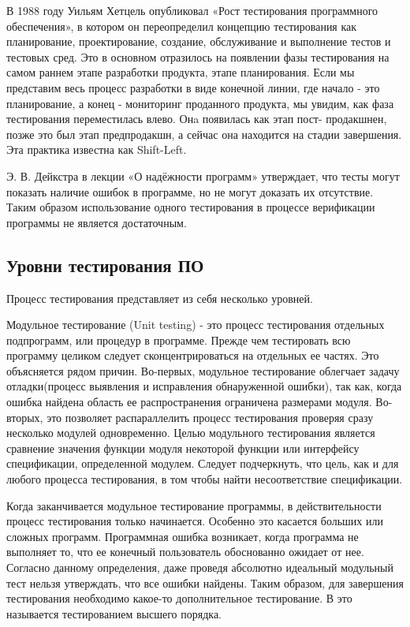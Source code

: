 В 1988 году Уильям Хетцель опубликовал «Рост тестирования программного обеспечения»\cite{Hetzel}, в котором 
он переопределил концепцию тестирования как планирование, проектирование, создание, обслуживание 
и выполнение тестов и тестовых сред. Это  в основном отразилось на появлении фазы тестирования 
на самом раннем этапе разработки продукта, этапе планирования. Если мы представим весь процесс 
разработки в виде конечной линии, где начало - это планирование, а конец - мониторинг проданного 
продукта, мы увидим, как фаза тестирования переместилась влево. Онa появилась как этап пост-
продакшнен, позже это был этап предпродакшн, а сейчас она находится на стадии завершения. Эта 
практика известна как Shift-Left.

Э. В. Дейкстра в лекции «О надёжности программ» утверждает, что тесты могут показать наличие 
ошибок в программе, но не могут доказать их отсутствие\cite{Dijkstra}. Таким образом 
использование одного тестирования в процессе верификации программы не является достаточным. 

\subsection{Уровни тестирования ПО}
Процесс тестирования представляет из себя несколько уровней. 

Модульное тестирование (Unit testing) - это процесс тестирования отдельных подпрограмм, или 
процедур в программе. Прежде чем тестировать всю программу целиком следует сконцентрироваться 
на отдельных ее частях. Это объясняется рядом причин. Во-первых, модульное тестирование облегчает задачу
отладки(процесс выявления и исправления обнаруженной ошибки), так как, когда ошибка найдена 
область ее распространения ограничена размерами модуля. Во-вторых, это позволяет распараллелить 
процесс тестирования проверяя сразу несколько модулей одновременно. Целью модульного тестирования
является сравнение значения функции модуля некоторой функции или интерфейсу спецификации, 
определенной модулем. Следует подчеркнуть, что цель, как и для любого процесса тестирования, в том
чтобы найти несоответствие спецификации. 

Когда заканчивается модульное тестирование программы, в действительности процесс тестирования 
только начинается. Особенно это касается больших или сложных программ. Программная ошибка возникает, когда программа не выполняет то, что ее конечный пользователь обоснованно ожидает от 
нее. Согласно данному определения, даже проведя абсолютно идеальный модульный тест нельзя 
утверждать, что все ошибки найдены. Таким образом, для завершения тестирования необходимо какое-то 
дополнительное тестирование. В\cite{Myers2004} это называется тестированием высшего порядка.

